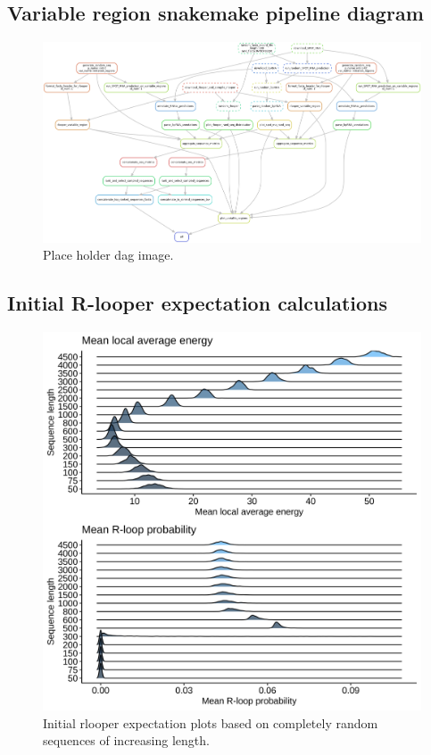 \documentclass[11pt]{article}
\begin{document}
\subsection{Variable region snakemake pipeline diagram}

\begin{figure}[H]
	\includegraphics[width=15cm]{images/misc/dag.png}
	\centering
	\caption{Place holder dag image.}
\end{figure}

\subsection{Initial R-looper expectation calculations}


\begin{figure}[H]
	\includegraphics[width=15cm]{images/plots/rand_seq_LAE_dist.png}
	\centering
	\caption{Initial rlooper expectation plots based on completely random sequences of increasing length.}
\end{figure}



\pagebreak


\end{document}
